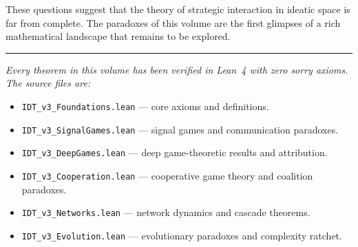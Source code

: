 These questions suggest that the theory of strategic interaction in ideatic space is far from complete. The paradoxes of this volume are the first glimpses of a rich mathematical landscape that remains to be explored.

\bigskip

\begin{center}
\rule{0.5\textwidth}{0.5pt}
\end{center}

\bigskip

\noindent\textit{Every theorem in this volume has been verified in Lean~4 with zero sorry axioms. The source files are:}
\begin{itemize}
\item \texttt{IDT\_v3\_Foundations.lean} --- core axioms and definitions.
\item \texttt{IDT\_v3\_SignalGames.lean} --- signal games and communication paradoxes.
\item \texttt{IDT\_v3\_DeepGames.lean} --- deep game-theoretic results and attribution.
\item \texttt{IDT\_v3\_Cooperation.lean} --- cooperative game theory and coalition paradoxes.
\item \texttt{IDT\_v3\_Networks.lean} --- network dynamics and cascade theorems.
\item \texttt{IDT\_v3\_Evolution.lean} --- evolutionary paradoxes and complexity ratchet.
\end{itemize}
